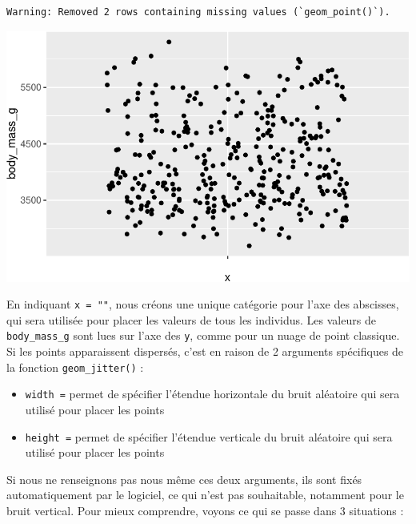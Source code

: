 \documentclass[
  a4paper,
  DIV=11,
  numbers=noendperiod,
  oneside]{scrreprt}
\providecommand{\tightlist}{%
  \setlength{\itemsep}{0pt}\setlength{\parskip}{0pt}}\usepackage{longtable,booktabs,array}
\begin{document}
\begin{verbatim}
Warning: Removed 2 rows containing missing values (`geom_point()`).
\end{verbatim}

\includegraphics{03-visualization_files/figure-pdf/unnamed-chunk-29-1.pdf}

En indiquant \texttt{x\ =\ ""}, nous créons une unique catégorie pour
l'axe des abscisses, qui sera utilisée pour placer les valeurs de tous
les individus. Les valeurs de \texttt{body\_mass\_g} sont lues sur l'axe
des \texttt{y}, comme pour un nuage de point classique. Si les points
apparaissent dispersés, c'est en raison de 2 arguments spécifiques de la
fonction \texttt{geom\_jitter()} :

\begin{itemize}
\tightlist
\item
  \texttt{width\ =} permet de spécifier l'étendue horizontale du bruit
  aléatoire qui sera utilisé pour placer les points
\item
  \texttt{height\ =} permet de spécifier l'étendue verticale du bruit
  aléatoire qui sera utilisé pour placer les points
\end{itemize}

Si nous ne renseignons pas nous même ces deux arguments, ils sont fixés
automatiquement par le logiciel, ce qui n'est pas souhaitable, notamment
pour le bruit vertical. Pour mieux comprendre, voyons ce qui se passe
dans 3 situations :
\end{document}
